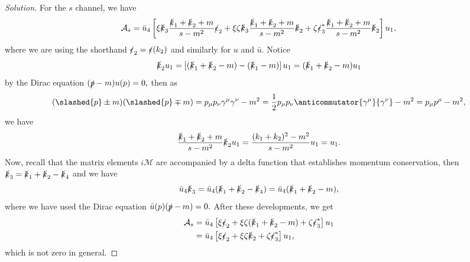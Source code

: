 \begin{proof}[Solution]
   For the \(s\) channel, we have
   \begin{equation*}
      \mathcal{A}_s = \bar{u}_4 \left[\xi\slashed{k}_3 \frac{\slashed{k}_1 + \slashed{k}_2 + m}{s - m^2} \slashed{\epsilon}_2 + \xi \zeta \slashed{k}_3 \frac{\slashed{k}_1 + \slashed{k}_2 + m}{s - m^2} \slashed{k}_2 + \zeta \slashed{\epsilon}^*_3 \frac{\slashed{k}_1 + \slashed{k}_2 + m}{s - m^2}\slashed{k}_2 \right] u_1,
   \end{equation*}
   where we are using the shorthand \(\slashed{\epsilon}_2 = \slashed{\epsilon}(k_2)\) and similarly for \(u\) and \(\bar{u}.\) Notice
   \begin{equation*}
      \slashed{k}_2 u_1 = \left[(\slashed{k}_1 + \slashed{k}_2 - m) - (\slashed{k}_1 - m)\right]u_1 = (\slashed{k}_1 + \slashed{k}_2 - m) u_1
   \end{equation*}
   by the Dirac equation \((\slashed{p} - m) u(p) = 0,\) then as
   \begin{equation*}
      (\slashed{p} \pm m)(\slashed{p} \mp m) = p_\mu p_\nu \gamma^\mu \gamma^\nu - m^2 = \frac12 p_\mu p_\nu \anticommutator{\gamma^\mu}{\gamma^\nu} - m^2 = p_\mu p^\mu - m^2,
   \end{equation*}
   we have
   \begin{equation*}
      \frac{\slashed{k}_1 + \slashed{k}_2 + m}{s - m^2}\slashed{k}_2 u_1 = \frac{(k_1 + k_2)^2 - m^2}{s - m^2} u_1 = u_1.
   \end{equation*}
   Now, recall that the matrix elements \(i \mathcal{M}\) are accompanied by a delta function that establishes momentum conservation, then \(\slashed{k}_3 = \slashed{k}_1 + \slashed{k}_2 - \slashed{k}_4\) and we have
   \begin{equation*}
       \bar{u}_4 \slashed{k}_3 = \bar{u}_4 (\slashed{k}_1 + \slashed{k}_2 - \slashed{k}_4) = \bar{u}_4(\slashed{k}_1 + \slashed{k}_2 - m),
   \end{equation*}
   where we have used the Dirac equation \(\bar{u}(p) (\slashed{p} - m) = 0.\) After these developments, we get
   \begin{align*}
      \mathcal{A}_s &= \bar{u}_4 \left[\xi \slashed{\epsilon}_2 + \xi \zeta (\slashed{k}_1 + \slashed{k}_2 - m) + \zeta \slashed{\epsilon}^*_3\right]u_1\\
                    &= \bar{u}_4 \left[\xi \slashed{\epsilon}_2 + \xi \zeta \slashed{k}_2 + \zeta \slashed{\epsilon}^*_3\right]u_1,
   \end{align*}
   which is not zero in general.


\end{proof}
